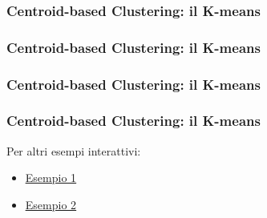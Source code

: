 \begin{frame}

	\frametitle{{\color{GradientDescentDiagramBlue}Centroid-based Clustering}: il K-means}

		\centering

\end{frame}


\begin{frame}

	\frametitle{{\color{GradientDescentDiagramBlue}Centroid-based Clustering}: il K-means}

		\centering

\end{frame}


\begin{frame}

	\frametitle{{\color{GradientDescentDiagramBlue}Centroid-based Clustering}: il K-means}

		\centering

\end{frame}


\begin{frame}

	\frametitle{{\color{GradientDescentDiagramBlue}Centroid-based Clustering}: il K-means}

	\begin{block}{}
		Per altri esempi interattivi:\\
		\begin{itemize}
			\item \underline{\href{https://stanford.edu/class/engr108/visualizations/kmeans/kmeans.html}{Esempio 1}}
			\item \underline{\href{http://alekseynp.com/viz/k-means.html}{Esempio 2}}
		\end{itemize}
	\end{block}

\end{frame}


